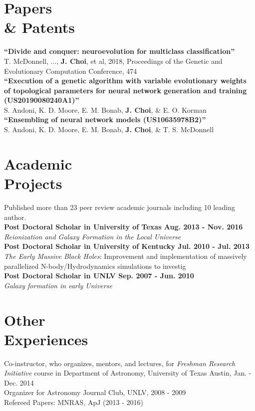\documentclass[margin,centered]{res}
\begin{document}
\begin{resume}
\section{Papers  \\ \& Patents}

{\bf ``Divide and conquer: neuroevolution for multiclass classification''} \\ T. McDonnell, ..., \textbf{J. Choi}, et al, 2018, Proceedings of the Genetic and Evolutionary Computation Conference, 474 \\
{\bf ``Execution of a genetic algorithm with variable evolutionary weights of topological parameters for neural network generation and training (US20190080240A1)''} \\ S. Andoni, K. D. Moore, E. M. Bonab, \textbf{J. Choi}, \& E. O. Korman \\
{\bf ``Ensembling of neural network models (US10635978B2)''} \\ S. Andoni, K. D. Moore, E. M. Bonab, \textbf{J. Choi}, \& T. S. McDonnell

\section{Academic \\ Projects} Published more than 23 peer review academic journals including 10 leading author.\\
{\bf Post Doctoral Scholar in University of Texas Aug. 2013 - Nov. 2016} \\ 
{\it Reionization and Galaxy Formation in the Local Universe}\\
{\bf Post Doctoral Scholar in University of Kentucky Jul. 2010 - Jul. 2013 } \\
{\it The Early Massive Black Holes}: Improvement and implementation of massively parallelized N-body/Hydrodynamics simulations to investig\\
{\bf Post Doctoral Scholar in UNLV Sep. 2007 - Jun. 2010} \\
{\it Galaxy formation in early Universe}

\section{Other \\ Experiences} 
Co-instructor, who organizes, mentors, and lectures,  for {\it Freshman Research Initiative} course in Department of Astronomy, University of Texas Austin, Jan. - Dec. 2014  \\
Organizer for Astronomy Journal Club, UNLV, 2008 - 2009 \\
Refereed Papers: MNRAS, ApJ (2013 - 2016)


\end{resume}
\end{document}
